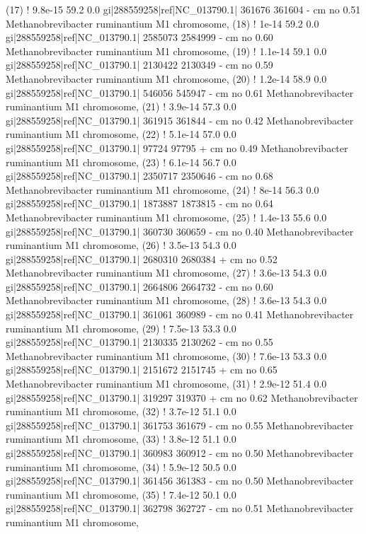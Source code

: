 \begin{sreoutput}
 (17) !   9.8e-15   59.2   0.0  gi|288559258|ref|NC_013790.1|  361676  361604 -  cm    no 0.51  Methanobrevibacter ruminantium M1 chromosome, 
 (18) !     1e-14   59.2   0.0  gi|288559258|ref|NC_013790.1| 2585073 2584999 -  cm    no 0.60  Methanobrevibacter ruminantium M1 chromosome, 
 (19) !   1.1e-14   59.1   0.0  gi|288559258|ref|NC_013790.1| 2130422 2130349 -  cm    no 0.59  Methanobrevibacter ruminantium M1 chromosome, 
 (20) !   1.2e-14   58.9   0.0  gi|288559258|ref|NC_013790.1|  546056  545947 -  cm    no 0.61  Methanobrevibacter ruminantium M1 chromosome, 
 (21) !   3.9e-14   57.3   0.0  gi|288559258|ref|NC_013790.1|  361915  361844 -  cm    no 0.42  Methanobrevibacter ruminantium M1 chromosome, 
 (22) !   5.1e-14   57.0   0.0  gi|288559258|ref|NC_013790.1|   97724   97795 +  cm    no 0.49  Methanobrevibacter ruminantium M1 chromosome, 
 (23) !   6.1e-14   56.7   0.0  gi|288559258|ref|NC_013790.1| 2350717 2350646 -  cm    no 0.68  Methanobrevibacter ruminantium M1 chromosome, 
 (24) !     8e-14   56.3   0.0  gi|288559258|ref|NC_013790.1| 1873887 1873815 -  cm    no 0.64  Methanobrevibacter ruminantium M1 chromosome, 
 (25) !   1.4e-13   55.6   0.0  gi|288559258|ref|NC_013790.1|  360730  360659 -  cm    no 0.40  Methanobrevibacter ruminantium M1 chromosome, 
 (26) !   3.5e-13   54.3   0.0  gi|288559258|ref|NC_013790.1| 2680310 2680384 +  cm    no 0.52  Methanobrevibacter ruminantium M1 chromosome, 
 (27) !   3.6e-13   54.3   0.0  gi|288559258|ref|NC_013790.1| 2664806 2664732 -  cm    no 0.60  Methanobrevibacter ruminantium M1 chromosome, 
 (28) !   3.6e-13   54.3   0.0  gi|288559258|ref|NC_013790.1|  361061  360989 -  cm    no 0.41  Methanobrevibacter ruminantium M1 chromosome, 
 (29) !   7.5e-13   53.3   0.0  gi|288559258|ref|NC_013790.1| 2130335 2130262 -  cm    no 0.55  Methanobrevibacter ruminantium M1 chromosome, 
 (30) !   7.6e-13   53.3   0.0  gi|288559258|ref|NC_013790.1| 2151672 2151745 +  cm    no 0.65  Methanobrevibacter ruminantium M1 chromosome, 
 (31) !   2.9e-12   51.4   0.0  gi|288559258|ref|NC_013790.1|  319297  319370 +  cm    no 0.62  Methanobrevibacter ruminantium M1 chromosome, 
 (32) !   3.7e-12   51.1   0.0  gi|288559258|ref|NC_013790.1|  361753  361679 -  cm    no 0.55  Methanobrevibacter ruminantium M1 chromosome, 
 (33) !   3.8e-12   51.1   0.0  gi|288559258|ref|NC_013790.1|  360983  360912 -  cm    no 0.50  Methanobrevibacter ruminantium M1 chromosome, 
 (34) !   5.9e-12   50.5   0.0  gi|288559258|ref|NC_013790.1|  361456  361383 -  cm    no 0.50  Methanobrevibacter ruminantium M1 chromosome, 
 (35) !   7.4e-12   50.1   0.0  gi|288559258|ref|NC_013790.1|  362798  362727 -  cm    no 0.51  Methanobrevibacter ruminantium M1 chromosome, 

\end{sreoutput}
